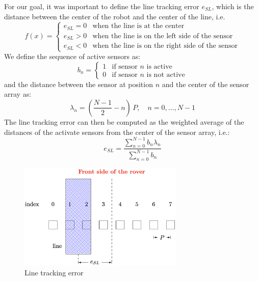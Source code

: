 For our goal, it was important to define the line tracking error $e_{SL}$, which is the distance between the center of the robot and the center of the line, i.e.
\begin{equation}
    f(x) = \left\{
    \begin{array}{ll}
        e_{SL} = 0 & \text{when the line is at the center} \\
        e_{SL} > 0 & \text{when the line is on the left side of the sensor} \\
        e_{SL} < 0 & \text{when the line is on the right side of the sensor}
    \end{array}
    \right.
\end{equation}
We define the sequence of active sensors as:
\begin{equation}
    b_n = 
    \begin{cases}
        1 & \text{if sensor $n$ is active} \\
        0 & \text{if sensor $n$ is not active}
    \end{cases}
\end{equation}
and the distance between the sensor at position $n$ and the center of the sensor array as:
\begin{equation}
    \label{eq:lambda_n}
    \lambda_n = \left( \frac{N-1}{2} - n \right) \, P, \quad n = 0, \ldots, N-1
\end{equation}
The line tracking error can then be computed as the weighted average of the distances of the activate sensors from the center of the sensor array, i.e.:
\begin{equation}
    \label{eq:e_sl}
    e_{SL} = \frac{\sum_{n=0}^{N-1} b_n \lambda_n}{\sum_{n=0}^{N-1} b_n} 
\end{equation}

\begin{figure} [H]
    \centering
    \includegraphics[width=0.7\textwidth]{lab4/figures/e_sl.png}
    \caption{Line tracking error}
    \label{fig:line_tracking_error}
\end{figure}

